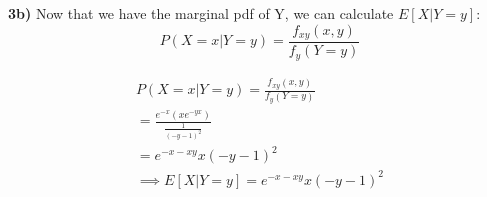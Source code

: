 \textbf{3b)} Now that we have the marginal pdf of Y, we can calculate $E[X | Y = y]$: \\
$$P(X = x | Y = y)  = \frac{f_{xy}(x,y)}{f_{y}(Y = y)}$$

\begin{equation}
    \begin{split}
        P(X = x | Y = y)  = \frac{f_{xy}(x,y)}{f_{y}(Y = y)}\\
        = \frac{e^{-x} \left(xe^{-yx}\right)}{\frac{1}{\left(-y-1\right)^2}} \\
        = e^{-x-xy}x\left(-y-1\right)^2 \\
        \implies E[X | Y = y] = e^{-x-xy}x\left(-y-1\right)^2
    \end{split}
\end{equation}